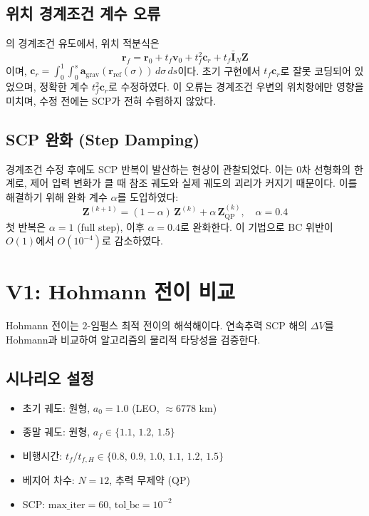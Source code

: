 \documentclass[11pt]{article}
\begin{document}
\subsection{위치 경계조건 계수 오류}

\cite{report007}의 경계조건 유도에서, 위치 적분식은
\begin{equation}
  \mathbf{r}_f = \mathbf{r}_0 + t_f \mathbf{v}_0
  + t_f^2 \mathbf{c}_r + t_f \bar{\mathbf{I}}_N \mathbf{Z}
  \label{eq:pos_bc}
\end{equation}
이며, $\mathbf{c}_r = \int_0^1\!\int_0^s \mathbf{a}_{\text{grav}}(\mathbf{r}_{\text{ref}}(\sigma))\,d\sigma\,ds$이다.
초기 구현에서 $t_f \mathbf{c}_r$로 잘못 코딩되어 있었으며,
정확한 계수 $t_f^2 \mathbf{c}_r$로 수정하였다.
이 오류는 경계조건 우변의 위치항에만 영향을 미치며,
수정 전에는 SCP가 전혀 수렴하지 않았다.

\subsection{SCP 완화 (Step Damping)}

경계조건 수정 후에도 SCP 반복이 발산하는 현상이 관찰되었다.
이는 0차 선형화의 한계로, 제어 입력 변화가 클 때
참조 궤도와 실제 궤도의 괴리가 커지기 때문이다.
이를 해결하기 위해 완화 계수 $\alpha$를 도입하였다:
\begin{equation}
  \mathbf{Z}^{(k+1)} = (1-\alpha)\,\mathbf{Z}^{(k)} + \alpha\,\mathbf{Z}_{\text{QP}}^{(k)}, \quad \alpha = 0.4
  \label{eq:relaxation}
\end{equation}
첫 반복은 $\alpha=1$ (full step), 이후 $\alpha=0.4$로 완화한다.
이 기법으로 BC 위반이 $O(1)$에서 $O(10^{-4})$로 감소하였다.

\section{V1: Hohmann 전이 비교}
\label{sec:v1}

Hohmann 전이는 2-임펄스 최적 전이의 해석해이다.
연속추력 SCP 해의 $\Delta V$를 Hohmann과 비교하여
알고리즘의 물리적 타당성을 검증한다.

\subsection{시나리오 설정}

\begin{itemize}
  \item 초기 궤도: 원형, $a_0 = 1.0$ (LEO, $\approx 6778$ km)
  \item 종말 궤도: 원형, $a_f \in \{1.1,\, 1.2,\, 1.5\}$
  \item 비행시간: $t_f/t_{f,H} \in \{0.8,\, 0.9,\, 1.0,\, 1.1,\, 1.2,\, 1.5\}$
  \item 베지어 차수: $N=12$, 추력 무제약 (QP)
  \item SCP: $\text{max\_iter}=60$, $\text{tol\_bc}=10^{-2}$
\end{itemize}
\end{document}
